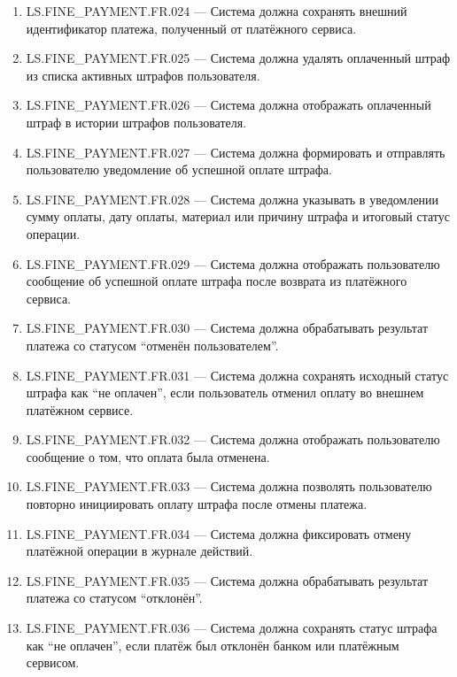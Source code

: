 \documentclass[12pt,a4paper]{article}
\begin{document}
\begin{enumerate}
		\item LS.FINE\_PAYMENT.FR.024 --- Система должна сохранять внешний идентификатор платежа,
		полученный от платёжного сервиса.
		
		\item LS.FINE\_PAYMENT.FR.025 --- Система должна удалять оплаченный штраф из списка
		активных штрафов пользователя.
		
		\item LS.FINE\_PAYMENT.FR.026 --- Система должна отображать оплаченный штраф в истории
		штрафов пользователя.
		
		\item LS.FINE\_PAYMENT.FR.027 --- Система должна формировать и отправлять пользователю
		уведомление об успешной оплате штрафа.
		
		\item LS.FINE\_PAYMENT.FR.028 --- Система должна указывать в уведомлении сумму оплаты,
		дату оплаты, материал или причину штрафа и итоговый статус операции.
		
		\item LS.FINE\_PAYMENT.FR.029 --- Система должна отображать пользователю сообщение об
		успешной оплате штрафа после возврата из платёжного сервиса.
		
		\item LS.FINE\_PAYMENT.FR.030 --- Система должна обрабатывать результат платежа со статусом
		``отменён пользователем''.
		
		\item LS.FINE\_PAYMENT.FR.031 --- Система должна сохранять исходный статус штрафа как
		``не оплачен'', если пользователь отменил оплату во внешнем платёжном сервисе.
		
		\item LS.FINE\_PAYMENT.FR.032 --- Система должна отображать пользователю сообщение о том,
		что оплата была отменена.
		
		\item LS.FINE\_PAYMENT.FR.033 --- Система должна позволять пользователю повторно инициировать
		оплату штрафа после отмены платежа.
		
		\item LS.FINE\_PAYMENT.FR.034 --- Система должна фиксировать отмену платёжной операции
		в журнале действий.
		
		\item LS.FINE\_PAYMENT.FR.035 --- Система должна обрабатывать результат платежа со статусом
		``отклонён''.
		
		\item LS.FINE\_PAYMENT.FR.036 --- Система должна сохранять статус штрафа как ``не оплачен'',
		если платёж был отклонён банком или платёжным сервисом.
		

\end{enumerate}
\end{document}
